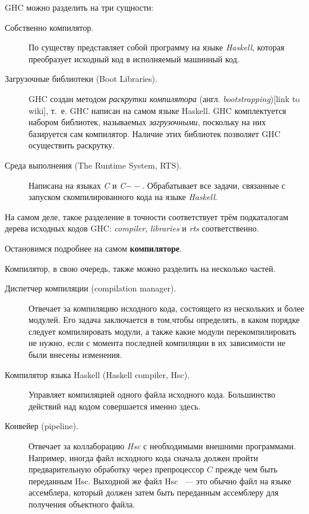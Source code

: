 GHC можно разделить на три сущности:
\begin{description}
\item[Собственно компилятор.] По существу представляет собой программу на языке \textit{Haskell}, которая преобразует исходный код в исполняемый машинный код.
\item[Загрузочные библиотеки (Boot Libraries).] GHC создан методом \textit{раскрутки компилятора} (англ. \textit{bootstrapping})[link to wiki], т.~е. GHC написан на самом языке Haskell. GHC комплектуется набором библиотек, называемых \textit{загрузочными}, поскольку на них базируется сам компилятор. Наличие этих библиотек позволяет GHC осуществить раскрутку.
\item[Среда выполнения (The Runtime System, RTS).] Написана на языках \textit{C} и \textit{C$--$}. Обрабатывает все задачи, связанные с запуском скомпилированного кода на языке \textit{Haskell}.
\end{description}
На самом деле, такое разделение в точности соответствует трём подкаталогам дерева исходных кодов GHC: \textit{compiler}, \textit{libraries} и \textit{rts} соответственно.

Остановимся подробнее на самом \textbf{компиляторе}.

Компилятор, в свою очередь, также можно разделить на несколько частей.
\begin{description}
\item[Диспетчер компиляции (compilation manager).] Отвечает за компиляцию исходного кода, состоящего из нескольких и более модулей. Его задача заключается в том,чтобы определять, в каком порядке следует компилировать модули, а также какие модули перекомпилировать не нужно, если с момента последней компиляции в их зависимости не были внесены изменения.
\item[Компилятор языка Haskell (Haskell compiler, Hsc).] Управляет компиляцией одного файла исходного кода. Большинство действий над кодом совершается именно здесь.
\item[Конвейер (pipeline).] Отвечает за коллаборацию \textit{Hsc} с необходимыми внешними программами. Например, иногда файл исходного кода сначала должен пройти предварительную обработку через препроцессор $C$ прежде чем быть переданным Hsc. Выходной же файл Hsc ~--- это обычно файл на языке ассемблера, который должен затем быть переданным ассемблеру для получения объектного файла.
\end{description}



